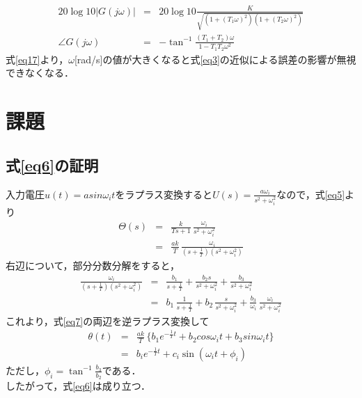 \documentclass{jsarticle}
\begin{document}
\begin{eqnarray}
 20 \log{10}|G(j\omega)| & = & 20 \log{10}\frac{K}{\sqrt{(1 + (T_1 \omega)^2)(1 + (T_2 \omega)^2)}} \nonumber \\ 
 \angle G(j \omega) & = & -\tan^{-1} \frac{(T_1 + T_2)\omega}{1 - T_1 T_2 \omega^2}
  \label{eq17}
\end{eqnarray}
式\ref{eq17}より，$\omega$[rad/s]の値が大きくなると式\ref{eq3}の近似による誤差の影響が無視できなくなる．




 \section{課題}
  \subsection{式\ref{eq6}の証明}
  入力電圧$u(t) = asin\omega_i t$をラプラス変換すると$U(s) = \frac{a\omega_i}{s^2 + \omega_i^2}$なので，式\ref{eq5}より
  \begin{eqnarray}
   \Theta(s) & = & \frac{k}{Ts + 1} \, \frac{\omega_i}{s^2 + \omega_i^2} \nonumber \\ & = & \frac{ak}{T}\,\frac{\omega_i}{(s+\frac{1}{T})(s^2 + \omega_i^2)}
    \label{eq7}
  \end{eqnarray}
  右辺について，部分分数分解をすると，
  \begin{eqnarray*}
   \frac{\omega_i}{(s+\frac{1}{T})(s^2 + \omega_i^2)} & =  & \frac{b_1}{s + \frac{1}{T}} + \frac{b_2 s}{s^2 + \omega_i^2} + \frac{b_3}{s^2 + \omega_i^2} \\ & = & b_1 \, \frac{1}{s + \frac{1}{T}} + b_2 \, \frac{s}{s^2 + \omega_i^2} + \frac{b_3}{\omega_i} \, \frac{\omega_i}{s^2 + \omega_i^2}
  \end{eqnarray*}
  これより，式\ref{eq7}の両辺を逆ラプラス変換して
  \begin{eqnarray*}
   \theta(t) & = & \frac{ak}{T} \, \{b_1 e^{-\frac{1}{T} t} + b_2 cos\omega_i t + b_3 sin\omega_i t \} \\ & = & b_i e^{-\frac{1}{T} t} + c_i \sin(\omega_i t + \phi_i)
  \end{eqnarray*}
  ただし，$\phi_i = \tan^{-1} \frac{b_3}{b_2}$である． \\
  したがって，式\ref{eq6}は成り立つ．

\newpage  

\thispagestyle{fancy}
\end{document}
